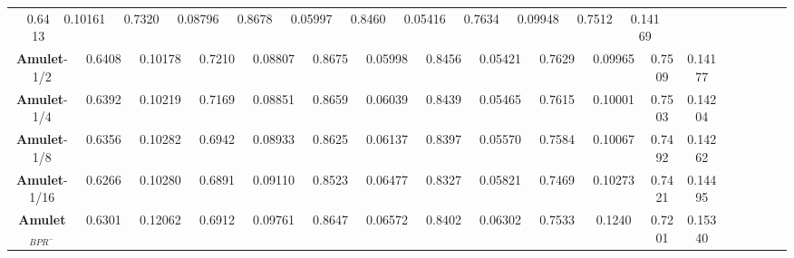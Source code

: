 \documentclass[10pt,twocolumn,letterpaper]{article}
\begin{document}
\begin{table*}
\begin{center}
\begin{tabular}{|c|c|c|c|c|c|c|c|c|c|c|c|c|c|c|c|c|c|c|c|c|c|c|c|c|||c|c|c|c|c|c|c|c|||}
&\multicolumn{2}{|c|}{0.6413}&\multicolumn{2}{|c|}{0.10161}&\multicolumn{2}{|c|}{\textcolor[rgb]{0,0,1}{0.7320}}&\multicolumn{2}{|c|}{\textcolor[rgb]{0,0,1}{0.08796}}&\multicolumn{2}{|c|}{\textcolor[rgb]{0,1,0}{0.8678}}&\multicolumn{2}{|c|}{\textcolor[rgb]{0,0,1}{0.05997}}&\multicolumn{2}{|c|}{\textcolor[rgb]{0,0,1}{0.8460}}&\multicolumn{2}{|c|}{\textcolor[rgb]{0,0,1}{0.05416}}&\multicolumn{2}{|c|}{\textcolor[rgb]{0,1,0}{0.7634}}&\multicolumn{2}{|c|}{\textcolor[rgb]{0,0,1}{0.09948}}&\multicolumn{2}{|c|}{\textcolor[rgb]{0,0,1}{0.7512}}&\multicolumn{2}{|c|}{\textcolor[rgb]{0,0,1}{0.14169}}\\
\multicolumn{4}{|c|}{\textbf{Amulet}-1/2}
&\multicolumn{2}{|c|}{0.6408}&\multicolumn{2}{|c|}{0.10178}&\multicolumn{2}{|c|}{0.7210}&\multicolumn{2}{|c|}{0.08807}&\multicolumn{2}{|c|}{\textcolor[rgb]{0,0,1}{0.8675}}&\multicolumn{2}{|c|}{0.05998}&\multicolumn{2}{|c|}{0.8456}&\multicolumn{2}{|c|}{0.05421}&\multicolumn{2}{|c|}{0.7629}&\multicolumn{2}{|c|}{0.09965}&\multicolumn{2}{|c|}{0.7509}&\multicolumn{2}{|c|}{0.14177}\\
\multicolumn{4}{|c|}{\textbf{Amulet}-1/4}
&\multicolumn{2}{|c|}{0.6392}&\multicolumn{2}{|c|}{0.10219}&\multicolumn{2}{|c|}{0.7169}&\multicolumn{2}{|c|}{0.08851}&\multicolumn{2}{|c|}{0.8659}&\multicolumn{2}{|c|}{0.06039}&\multicolumn{2}{|c|}{0.8439}&\multicolumn{2}{|c|}{0.05465}&\multicolumn{2}{|c|}{0.7615}&\multicolumn{2}{|c|}{0.10001}&\multicolumn{2}{|c|}{0.7503}&\multicolumn{2}{|c|}{0.14204}\\
\multicolumn{4}{|c|}{\textbf{Amulet}-1/8}
&\multicolumn{2}{|c|}{0.6356}&\multicolumn{2}{|c|}{0.10282}&\multicolumn{2}{|c|}{0.6942}&\multicolumn{2}{|c|}{0.08933}&\multicolumn{2}{|c|}{0.8625}&\multicolumn{2}{|c|}{0.06137}&\multicolumn{2}{|c|}{0.8397}&\multicolumn{2}{|c|}{0.05570}&\multicolumn{2}{|c|}{0.7584}&\multicolumn{2}{|c|}{0.10067}&\multicolumn{2}{|c|}{0.7492}&\multicolumn{2}{|c|}{0.14262}\\
\multicolumn{4}{|c|}{\textbf{Amulet}-1/16}
&\multicolumn{2}{|c|}{0.6266}&\multicolumn{2}{|c|}{0.10280}&\multicolumn{2}{|c|}{0.6891}&\multicolumn{2}{|c|}{0.09110}&\multicolumn{2}{|c|}{0.8523}&\multicolumn{2}{|c|}{0.06477}&\multicolumn{2}{|c|}{0.8327}&\multicolumn{2}{|c|}{0.05821}&\multicolumn{2}{|c|}{0.7469}&\multicolumn{2}{|c|}{0.10273}&\multicolumn{2}{|c|}{0.7421}&\multicolumn{2}{|c|}{0.14495}\\
\multicolumn{4}{|c|}{\textbf{Amulet}$_{BPR^{-}}$}
&\multicolumn{2}{|c|}{0.6301}&\multicolumn{2}{|c|}{0.12062}&\multicolumn{2}{|c|}{0.6912}&\multicolumn{2}{|c|}{0.09761}&\multicolumn{2}{|c|}{0.8647}&\multicolumn{2}{|c|}{0.06572}&\multicolumn{2}{|c|}{0.8402}&\multicolumn{2}{|c|}{0.06302}&\multicolumn{2}{|c|}{0.7533}&\multicolumn{2}{|c|}{0.1240}&\multicolumn{2}{|c|}{0.7201}&\multicolumn{2}{|c|}{0.15340}\\

\end{tabular}
\end{center}
\end{table*}
\end{document}
